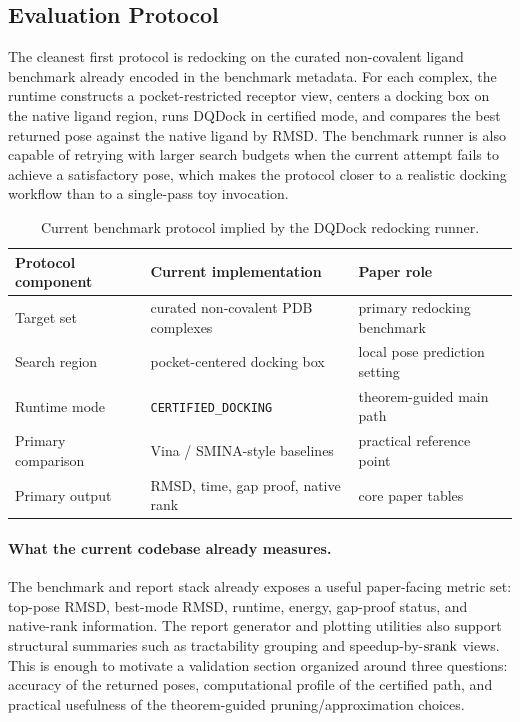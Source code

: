 \subsection{Evaluation Protocol}

The cleanest first protocol is redocking on the curated non-covalent ligand benchmark already encoded in the benchmark metadata. For each complex, the runtime constructs a pocket-restricted receptor view, centers a docking box on the native ligand region, runs DQDock in certified mode, and compares the best returned pose against the native ligand by RMSD. The benchmark runner is also capable of retrying with larger search budgets when the current attempt fails to achieve a satisfactory pose, which makes the protocol closer to a realistic docking workflow than to a single-pass toy invocation.

\begin{table}[t]
\centering
\small
\begin{tabular}{@{}lll@{}}
\toprule
\textbf{Protocol component} & \textbf{Current implementation} & \textbf{Paper role} \\
\midrule
Target set & curated non-covalent PDB complexes & primary redocking benchmark \\
Search region & pocket-centered docking box & local pose prediction setting \\
Runtime mode & \texttt{CERTIFIED\_DOCKING} & theorem-guided main path \\
Primary comparison & Vina / SMINA-style baselines & practical reference point \\
Primary output & RMSD, time, gap proof, native rank & core paper tables \\
\bottomrule
\end{tabular}
\caption{Current benchmark protocol implied by the DQDock redocking runner.}
\end{table}

\paragraph{What the current codebase already measures.}
The benchmark and report stack already exposes a useful paper-facing metric set: top-pose RMSD, best-mode RMSD, runtime, energy, gap-proof status, and native-rank information. The report generator and plotting utilities also support structural summaries such as tractability grouping and speedup-by-$\operatorname{srank}$ views. This is enough to motivate a validation section organized around three questions: accuracy of the returned poses, computational profile of the certified path, and practical usefulness of the theorem-guided pruning/approximation choices.

